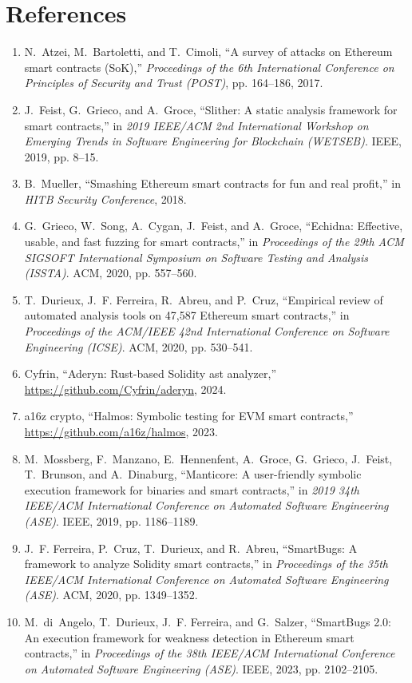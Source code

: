 \documentclass[conference]{IEEEtran}
\begin{document}
\section*{References}
\begin{enumerate}
\item N.~Atzei, M.~Bartoletti, and T.~Cimoli, ``A survey of attacks on {Ethereum} smart contracts ({SoK}),'' \emph{Proceedings of the 6th International Conference on Principles of Security and Trust (POST)}, pp. 164--186, 2017.
\item J.~Feist, G.~Grieco, and A.~Groce, ``Slither: A static analysis framework for smart contracts,'' in \emph{2019 IEEE/ACM 2nd International Workshop on Emerging Trends in Software Engineering for Blockchain (WETSEB)}. IEEE, 2019, pp. 8--15.
\item B.~Mueller, ``Smashing {Ethereum} smart contracts for fun and real profit,'' in \emph{HITB Security Conference}, 2018.
\item G.~Grieco, W.~Song, A.~Cygan, J.~Feist, and A.~Groce, ``Echidna: Effective, usable, and fast fuzzing for smart contracts,'' in \emph{Proceedings of the 29th ACM SIGSOFT International Symposium on Software Testing and Analysis (ISSTA)}. ACM, 2020, pp. 557--560.
\item T.~Durieux, J.~F. Ferreira, R.~Abreu, and P.~Cruz, ``Empirical review of automated analysis tools on 47,587 {Ethereum} smart contracts,'' in \emph{Proceedings of the ACM/IEEE 42nd International Conference on Software Engineering (ICSE)}. ACM, 2020, pp. 530--541.
\item {Cyfrin}, ``Aderyn: Rust-based {Solidity} ast analyzer,'' \url{https://github.com/Cyfrin/aderyn}, 2024.
\item {a16z crypto}, ``Halmos: Symbolic testing for {EVM} smart contracts,'' \url{https://github.com/a16z/halmos}, 2023.
\item M.~Mossberg, F.~Manzano, E.~Hennenfent, A.~Groce, G.~Grieco, J.~Feist, T.~Brunson, and A.~Dinaburg, ``Manticore: A user-friendly symbolic execution framework for binaries and smart contracts,'' in \emph{2019 34th IEEE/ACM International Conference on Automated Software Engineering (ASE)}. IEEE, 2019, pp. 1186--1189.
\item J.~F. Ferreira, P.~Cruz, T.~Durieux, and R.~Abreu, ``{SmartBugs}: A framework to analyze {Solidity} smart contracts,'' in \emph{Proceedings of the 35th IEEE/ACM International Conference on Automated Software Engineering (ASE)}. ACM, 2020, pp. 1349--1352.
\item M.~di~Angelo, T.~Durieux, J.~F. Ferreira, and G.~Salzer, ``{SmartBugs} 2.0: An execution framework for weakness detection in {Ethereum} smart contracts,'' in \emph{Proceedings of the 38th IEEE/ACM International Conference on Automated Software Engineering (ASE)}. IEEE, 2023, pp. 2102--2105.

\end{enumerate}
\end{document}
